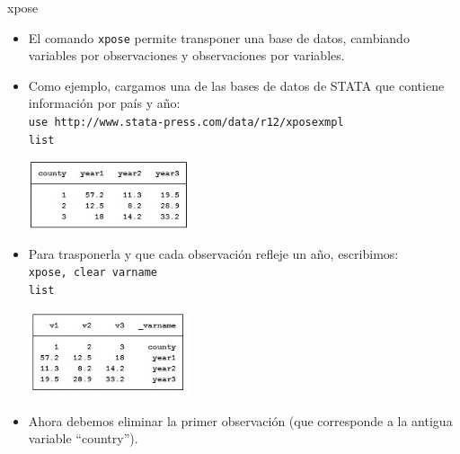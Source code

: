 \documentclass{beamer}
\begin{document}
\begin{frame}[allowframebreaks]{xpose}
\begin{itemize}
\item El comando \texttt{xpose} permite transponer una base de datos, cambiando variables por observaciones y observaciones por variables.
\item Como ejemplo, cargamos una de las bases de datos de STATA que contiene información por país y año: \\\medskip
{\footnotesize \texttt{use http://www.stata-press.com/data/r12/xposexmpl}\\
\texttt{list}}\\\medskip
\centerline{\includegraphics[height=2cm]{xpose.jpg}}
\item Para trasponerla y que cada observación refleje un año, escribimos:\\\medskip
{\footnotesize \texttt{xpose, clear varname}\\
\texttt{list}}\\
\centerline{\includegraphics[height=2.5cm]{xpose1.jpg}}
\item Ahora debemos eliminar la primer observación (que corresponde a la antigua variable ``country'').
\end{itemize}
\end{frame}
\end{document}

